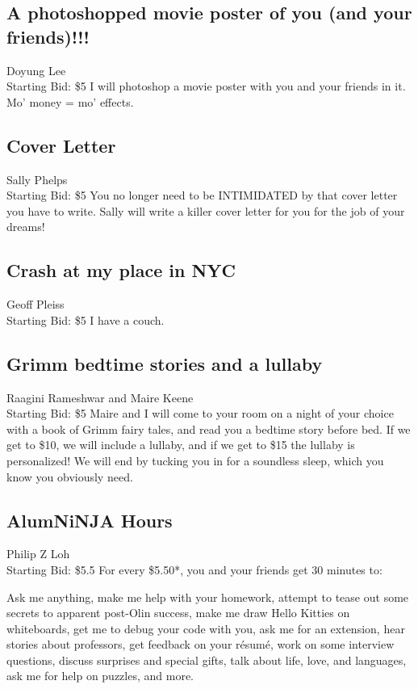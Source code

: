 \documentclass[11pt]{article}
\begin{document}
\subsection{A photoshopped movie poster of you (and your friends)!!!}
Doyung Lee
\\
Starting Bid: \$5
\newline
I will photoshop a movie poster with you and your friends in it. Mo' money = mo' effects.
\subsection{Cover Letter}
Sally Phelps
\\
Starting Bid: \$5
\newline
You no longer need to be INTIMIDATED by that cover letter you have to write.  Sally will write a killer cover letter for you for the job of your dreams!
\subsection{Crash at my place in NYC}
Geoff Pleiss
\\
Starting Bid: \$5
\newline
I have a couch.
\subsection{Grimm bedtime stories and a lullaby}
Raagini Rameshwar and Maire Keene
\\
Starting Bid: \$5
\newline
Maire and I will come to your room on a night of your choice with a book of Grimm fairy tales, and read you a bedtime story before bed. If we get to \$10, we will include a lullaby, and if we get to \$15 the lullaby is personalized! We will end by tucking you in for a soundless sleep, which you know you obviously need.
\subsection{AlumNiNJA Hours}
Philip Z Loh
\\
Starting Bid: \$5.5
\newline
For every \$5.50*, you and your friends get 30 minutes to:

Ask me anything, make me help with your homework, attempt to tease out some secrets to apparent post-Olin success, make me draw Hello Kitties on whiteboards, get me to debug your code with you, ask me for an extension, hear stories about professors, get feedback on your résumé, work on some interview questions, discuss surprises and special gifts, talk about life, love, and languages, ask me for help on puzzles, and more.
\end{document}
